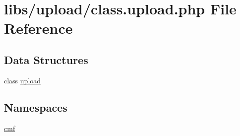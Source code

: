 \hypertarget{class_8upload_8php}{}\section{libs/upload/class.upload.\+php File Reference}
\label{class_8upload_8php}
\subsection*{Data Structures}
\begin{DoxyCompactItemize}
\item 
class \hyperlink{classupload}{upload}
\end{DoxyCompactItemize}
\subsection*{Namespaces}
\begin{DoxyCompactItemize}
\item 
 \hyperlink{namespacecmf}{cmf}
\end{DoxyCompactItemize}
